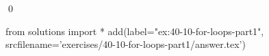 
\begin{ex}
  \label{ex:40-10-for-loops-part1}
  
  \qed
\end{ex}
\begin{python0}
from solutions import *
add(label="ex:40-10-for-loops-part1",
    srcfilename='exercises/40-10-for-loops-part1/answer.tex')
\end{python0}
